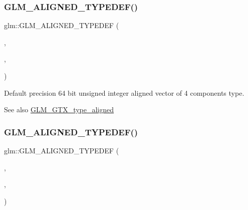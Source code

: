 \subsubsection{\texorpdfstring{G\+L\+M\+\_\+\+A\+L\+I\+G\+N\+E\+D\+\_\+\+T\+Y\+P\+E\+D\+E\+F()}{GLM\_ALIGNED\_TYPEDEF()}\hspace{0.1cm}{\footnotesize\ttfamily [136/209]}}
{\footnotesize\ttfamily glm\+::\+G\+L\+M\+\_\+\+A\+L\+I\+G\+N\+E\+D\+\_\+\+T\+Y\+P\+E\+D\+EF (\begin{DoxyParamCaption}\item[{\hyperlink{group__gtc__type__precision_gadafdefd5524bf6a48bb7c47edb787ae5}{u64vec4}}]{,  }\item[{aligned\+\_\+u64vec4}]{,  }\item[{32}]{ }\end{DoxyParamCaption})}

Default precision 64 bit unsigned integer aligned vector of 4 components type. \begin{DoxySeeAlso}{See also}
\hyperlink{group__gtx__type__aligned}{G\+L\+M\+\_\+\+G\+T\+X\+\_\+type\+\_\+aligned} 
\end{DoxySeeAlso}
\mbox{\label{group__gtx__type__aligned_gab3301bae94ef5bf59fbdd9a24e7d2a01}} 
\subsubsection{\texorpdfstring{G\+L\+M\+\_\+\+A\+L\+I\+G\+N\+E\+D\+\_\+\+T\+Y\+P\+E\+D\+E\+F()}{GLM\_ALIGNED\_TYPEDEF()}\hspace{0.1cm}{\footnotesize\ttfamily [137/209]}}
{\footnotesize\ttfamily glm\+::\+G\+L\+M\+\_\+\+A\+L\+I\+G\+N\+E\+D\+\_\+\+T\+Y\+P\+E\+D\+EF (\begin{DoxyParamCaption}\item[{\hyperlink{group__gtc__type__precision_ga814f2f65354b6588b067cc5c67a6b340}{float32}}]{,  }\item[{aligned\+\_\+float32}]{,  }\item[{4}]{ }\end{DoxyParamCaption})}

